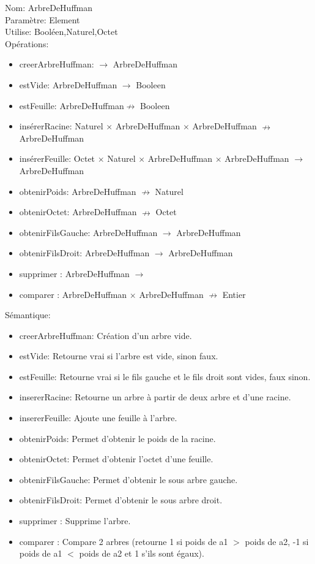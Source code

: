\documentclass{article}
\begin{document}
    \noindent
    Nom: ArbreDeHuffman \\
    Paramètre: Element \\
    Utilise: Booléen,Naturel,Octet \\
    Opérations: \begin{itemize}[label=$\ $, leftmargin=2cm, itemsep=0cm]
        \item creerArbreHuffman: $\rightarrow $ ArbreDeHuffman
        \item estVide: ArbreDeHuffman $ \rightarrow$ Booleen
        \item estFeuille: ArbreDeHuffman$  \nrightarrow $ Booleen
        \item insérerRacine: Naturel  $ \times $  ArbreDeHuffman  $ \times $  ArbreDeHuffman $ \nrightarrow$  ArbreDeHuffman
        \item insérerFeuille: Octet  $ \times $  Naturel  $ \times $  ArbreDeHuffman $ \times $ ArbreDeHuffman $  \rightarrow $ ArbreDeHuffman
        \item obtenirPoids: ArbreDeHuffman $ \nrightarrow $ Naturel 
        \item obtenirOctet: ArbreDeHuffman $ \nrightarrow$  Octet 
        \item obtenirFilsGauche: ArbreDeHuffman $ \rightarrow $ ArbreDeHuffman
        \item obtenirFilsDroit: ArbreDeHuffman $ \rightarrow$  ArbreDeHuffman
        \item supprimer : ArbreDeHuffman $ \rightarrow$
        \item comparer : ArbreDeHuffman $ \times $  ArbreDeHuffman $ \nrightarrow$ Entier
    \end{itemize}
    
    Sémantique: \begin{itemize}[label=$\- $, leftmargin=2cm, itemsep=0cm]
        \item creerArbreHuffman: Création d'un arbre vide.
        \item estVide: Retourne vrai si l'arbre est vide, sinon faux.
        \item estFeuille: Retourne vrai si le fils gauche et le fils droit sont vides, faux sinon.
        \item insererRacine: Retourne un arbre à partir de deux arbre et d'une racine.
        \item insererFeuille: Ajoute une feuille à l'arbre.
        \item obtenirPoids: Permet d'obtenir le poids de la racine.
        \item obtenirOctet: Permet d'obtenir l'octet d'une feuille.
        \item obtenirFilsGauche: Permet d'obtenir le sous arbre gauche.
        \item obtenirFilsDroit: Permet d'obtenir le sous arbre droit.
        \item supprimer : Supprime l'arbre.
        \item comparer : Compare 2 arbres (retourne 1 si poids de a1 $>$ poids de a2, -1 si poids de a1 $<$ poids de a2 et 1 s'ils sont égaux).
        
    
    \end{itemize}
    
\end{document}
